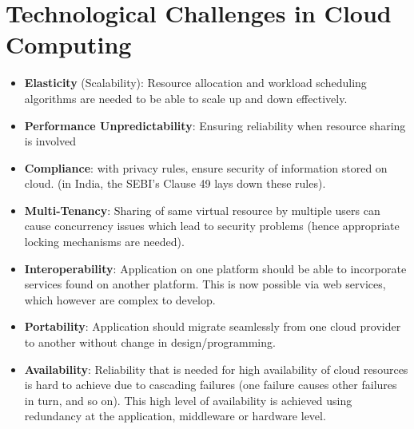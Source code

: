 \documentclass{article}
\begin{document}
\section{Technological Challenges in Cloud Computing}
\begin{itemize}
    \item \textbf{Elasticity} (Scalability): Resource allocation and workload scheduling algorithms are needed to be able to scale up and down effectively. 
    
    \item \textbf{Performance Unpredictability}: Ensuring reliability when resource sharing is involved
    
    \item \textbf{Compliance}: with privacy rules, ensure security of information stored on cloud. (in India, the SEBI's Clause 49 lays down these rules). 
    
    \item \textbf{Multi-Tenancy}: Sharing of same virtual resource by multiple users can cause concurrency issues which lead to security problems (hence appropriate locking mechanisms are needed). 
    
    \item \textbf{Interoperability}: Application on one platform should be able to incorporate services found on another platform. This is now possible via web services, which however are complex to develop.
    
    \item \textbf{Portability}: Application should migrate seamlessly from one cloud provider to another without change in design/programming.
    
    \item \textbf{Availability}: Reliability that is needed for high availability of cloud resources is hard to achieve due to cascading failures (one failure causes other failures in turn, and so on). This high level of availability is achieved using redundancy at the application, middleware or hardware level.
\end{itemize}
\end{document}

